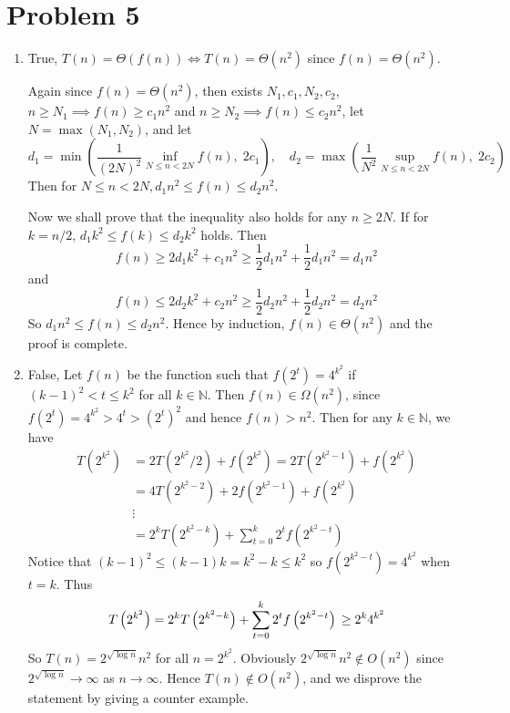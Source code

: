 \documentclass[12pt, a4paper]{article}
\begin{document}
\section{Problem 5}
\begin{enumerate}
  \item True, $T(n) = \Theta(f(n)) \iff T(n) = \Theta(n^2)$ since $f(n) = \Theta(n^2)$.

    Again since $f(n) = \Theta(n^2)$, then exists $N_1, c_1, N_2, c_2$, $n \geq N_1 \implies f(n) \geq c_1 n^2$
    and $n \geq N_2 \implies f(n) \leq c_2 n^2$, let $N = \max( N_1, N_2 )$, and let 
    \[ d_1 = \min \left( \frac{1}{(2N)^2} \inf_{N \leq n < 2N} f(n), \; 2c_1 \right), \quad 
      d_2 = \max \left( \frac{1}{N^2} \sup_{N \leq n < 2N} f(n), \; 2c_2 \right) \]
    Then for $N \leq n < 2N, d_1 n^2 \leq f(n) \leq d_2 n^2$.

    Now we shall prove that the inequality also holds for any $n \geq 2N$.
    If for $k = n/2$, $d_1 k^2 \leq f(k) \leq d_2 k^2$ holds. Then 
    \[ f(n) \geq 2 d_1 k^2 + c_1 n^2 \geq \frac{1}{2} d_1 n^2 + \frac{1}{2} d_1 n^2 = d_1 n^2 \]
    and
    \[ f(n) \leq 2 d_2 k^2 + c_2 n^2 \geq \frac{1}{2} d_2 n^2 + \frac{1}{2} d_2 n^2 = d_2 n^2 \]
    So $d_1 n^2 \leq f(n) \leq d_2 n^2$. Hence by induction, $f(n) \in \Theta(n^2)$ and the proof is complete.
  \item False, Let $f(n)$ be the function such that $f(2^t) = 4^{k^2}$ if $(k-1)^2 < t \leq k^2$ for all $k \in \mathbb{N}$.
    Then $f(n) \in \Omega(n^2)$, since $f(2^t) = 4^{k^2} > 4^{t} > (2^t)^2$ and hence $f(n) > n^2$.
    Then for any $k \in \mathbb{N}$, we have
    \begin{align*}
      T\left(2^{k^2}\right) &= 2T\left(2^{k^2}/2\right) +
      f\left(2^{k^2}\right) = 2T\left(2^{k^2-1}\right) + f\left(2^{k^2}\right) \\
      &= 4T\left(2^{k^2-2}\right) + 2f\left(2^{k^2 - 1}\right) + f\left(2^{k^2}\right) \\
      &\vdots \\
      &= 2^k T\left(2^{k^2-k}\right) + \sum_{t = 0}^{k} 2^t f\left(2^{k^2-t}\right)
    \end{align*}
    Notice that $(k-1)^2 \leq (k-1)k = k^2-k \leq k^2$ so
    $f\left(2^{k^2-t}\right) = 4^{k^2}$ when $t = k$. Thus
    \[
      T\left(2^{k^2}\right) 
      = 2^k T\left(2^{k^2-k}\right) + \sum_{t = 0}^{k} 2^t f\left(2^{k^2-t}\right) \\
      \geq 2^k 4^{k^2}    \]
    So $T(n) = 2^{\sqrt{\log n}} n^2$ for all $n = 2^{k^2}$. Obviously $2^{\sqrt{\log n}} n^2 \notin O(n^2)$
    since $2^{\sqrt{\log n}} \to \infty$ as $n \to \infty$. Hence $T(n) \notin O(n^2)$, and we disprove the 
    statement by giving a counter example.
\end{enumerate}
\end{document}
